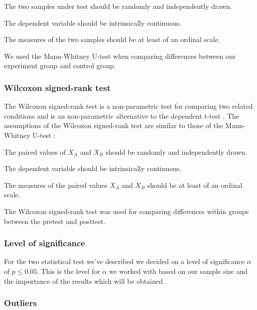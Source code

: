 \begin{enum}
  \item The two samples under test should be randomly and independently drawn.
  \item The dependent variable should be intrinsically continuous.
  \item The measures of the two samples should be at least of an ordinal scale.
\end{enum}

We used the Mann-Whitney U-test when comparing differences between our
experiment group and control group.

\subsubsection{Wilcoxon signed-rank test}

The Wilcoxon signed-rank test is a non-parametric test for comparing two
related conditions and is an non-parametric alternative to the
dependent t-test \citep[]{field05}.
The assumptions of the Wilcoxon signed-rank test are similar to those
of the Mann-Whitney U-test \citep[]{lowry08}:

\begin{enum}
  \item The paired values of $X_A$ and $X_B$
    should be randomly and independently drawn.
  \item The dependent variable should be intrinsically continuous.
  \item The measures of the paired values $X_A$ and $X_B$
    should be at least of an ordinal scale.
\end{enum}

The Wilcoxon signed-rank test was used for comparing differences within
groups between the pretest and posttest.

\subsubsection{Level of significance}
\label{section:empirical.method.data.analysis.level.of.significance}

For the two statistical test we've described we decided on a level
of significance $\alpha$ of $p \leq 0.05$.
This is the level for $\alpha$ we worked with based on
our sample size and the importance of the results which will be obtained
\citep[]{siegel88}.

\subsubsection{Outliers}

